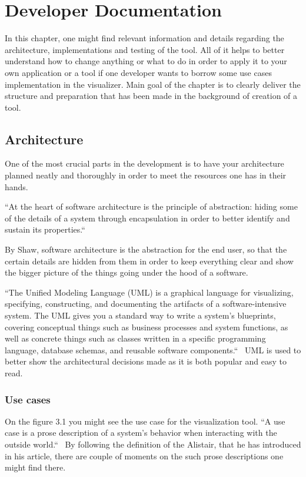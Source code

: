 \chapter{Developer Documentation} %
\label{ch:impl}

In this chapter, one might find relevant information and details regarding the architecture, implementations and testing of the tool. All of it helps to better understand how to change anything or what to do in order to apply it to your own application or a tool if one developer wants to borrow some use cases implementation in the visualizer. Main goal of the chapter is to clearly deliver the structure and preparation that has been made in the background of creation of a tool.

\section{Architecture}

One of the most crucial parts in the development is to have your architecture planned neatly and thoroughly in order to meet the resources one has in their hands. 

``At the heart of software architecture is the principle of abstraction: hiding some of the details of a system through encapsulation in order to better identify and sustain its properties.``~\cite{mshaw-data-knowledge}
	
By Shaw, software architecture is the abstraction for the end user, so that the certain details are hidden from them in order to keep everything clear and show the bigger picture of the things going under the hood of a software.

``The Unified Modeling Language (UML) is a graphical language for visualizing, specifying, constructing, and documenting the artifacts of a software-intensive system. The UML gives you a standard way to write a system's blueprints, covering conceptual things such as business processes and system functions, as well as concrete things such as classes written in a specific programming language, database schemas, and reusable software components.``~\cite{uml-user-guide} UML is used to better show the architectural decisions made as it is both popular and easy to read.

	
\subsection{Use cases}

On the figure 3.1 you might see the use case for the visualization tool. ``A use case is a prose description of a system's behavior when interacting with the outside world.``~\cite{alistair-human-and-technology} By following the definition of the Alistair, that he has introduced in his article, there are couple of moments on the such prose descriptions one might find there. 

